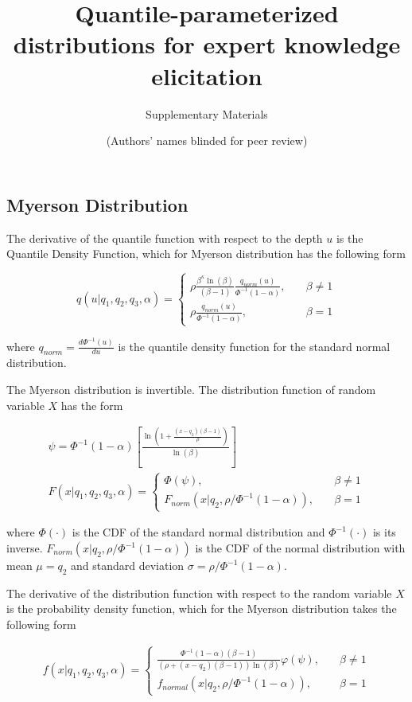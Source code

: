 \documentclass[
  letterpaper,
  DIV=11,
  numbers=noendperiod]{scrartcl}
\title{Quantile-parameterized distributions for expert knowledge
elicitation}
\subtitle{Supplementary Materials}
\author{(Authors' names blinded for peer review)}
\date{}
\begin{document}
\maketitle

\subsection*{Myerson Distribution}\label{myerson-distribution}

The derivative of the quantile function with respect to the depth \(u\)
is the Quantile Density Function, which for Myerson distribution has the
following form

\[
q(u\vert q_1,q_2,q_3,\alpha)=\begin{cases}
\rho\frac{\beta^\kappa\ln(\beta)}{(\beta-1)}\frac{q_{norm}(u)}{\Phi^{-1}(1-\alpha)}, \quad &\beta \neq 1\\
\rho\frac{q_{norm}(u)}{\Phi^{-1}(1-\alpha)}, \quad &\beta = 1
\end{cases}
\]

where \(q_{norm}=\frac{d\Phi^{-1}(u)}{du}\) is the quantile density
function for the standard normal distribution.

The Myerson distribution is invertible. The distribution function of
random variable \(X\) has the form

\[
\begin{gathered}
\psi=\Phi^{-1}\left(1-\alpha\right)\left[\frac{\ln\left(1+\frac{(x-q_2)(\beta-1)}{\rho}\right)}{\ln(\beta)}\right]\\
F(x\vert q_1, q_2, q_3, \alpha)=
\begin{cases}
\Phi(\psi), \quad &\beta\neq 1\\
F_{norm}(x\vert q_2,\rho/\Phi^{-1}(1-\alpha) ),  \quad &\beta=1
\end{cases}
\end{gathered}
\]

where \(\Phi(\cdot)\) is the CDF of the standard normal distribution and
\(\Phi^{-1}(\cdot)\) is its inverse.
\(F_{norm}(x\vert q_2,\rho/\Phi^{-1}(1-\alpha))\) is the CDF of the
normal distribution with mean \(\mu=q_2\) and standard deviation
\(\sigma=\rho/\Phi^{-1}(1-\alpha)\).

The derivative of the distribution function with respect to the random
variable \(X\) is the probability density function, which for the
Myerson distribution takes the following form

\[
\begin{gathered}
f(x\vert q_1, q_2, q_3, \alpha)=
\begin{cases}
\frac{\Phi^{-1}(1-\alpha)(\beta-1)}{(\rho+(x-q_2)(\beta-1))\ln(\beta)}\varphi(\psi), \quad &\beta\neq1\\
f_{normal}(x\vert q_2,\rho/\Phi^{-1}(1-\alpha)), \quad &\beta=1
\end{cases}
\end{gathered}
\]
\end{document}
